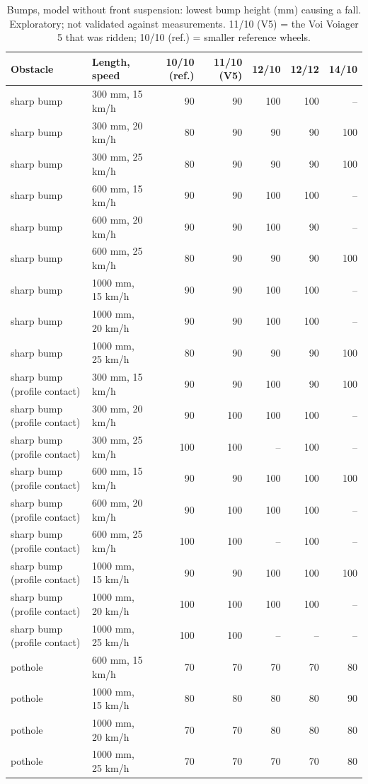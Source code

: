 \begin{table}[htbp]
\centering\small
\caption{Bumps, model without front suspension: lowest bump height (mm) causing a fall. Exploratory; not validated against measurements. 11/10 (V5) = the Voi Voiager 5 that was ridden; 10/10 (ref.) = smaller reference wheels.}\label{tab:D3}
\begin{tabular}{@{}llrrrrr@{}}
\toprule
Obstacle & Length, speed & 10/10 (ref.) & 11/10 (V5) & 12/10 & 12/12 & 14/10 \\
\midrule
sharp bump & 300 mm, 15 km/h & 90 & 90 & 100 & 100 & -- \\
sharp bump & 300 mm, 20 km/h & 80 & 90 & 90 & 90 & 100 \\
sharp bump & 300 mm, 25 km/h & 80 & 90 & 90 & 90 & 100 \\
sharp bump & 600 mm, 15 km/h & 90 & 90 & 100 & 100 & -- \\
sharp bump & 600 mm, 20 km/h & 90 & 90 & 100 & 90 & -- \\
sharp bump & 600 mm, 25 km/h & 80 & 90 & 90 & 90 & 100 \\
sharp bump & 1000 mm, 15 km/h & 90 & 90 & 100 & 100 & -- \\
sharp bump & 1000 mm, 20 km/h & 90 & 90 & 100 & 100 & -- \\
sharp bump & 1000 mm, 25 km/h & 80 & 90 & 90 & 90 & 100 \\
sharp bump (profile contact) & 300 mm, 15 km/h & 90 & 90 & 100 & 90 & 100 \\
sharp bump (profile contact) & 300 mm, 20 km/h & 90 & 100 & 100 & 100 & -- \\
sharp bump (profile contact) & 300 mm, 25 km/h & 100 & 100 & -- & 100 & -- \\
sharp bump (profile contact) & 600 mm, 15 km/h & 90 & 90 & 100 & 100 & 100 \\
sharp bump (profile contact) & 600 mm, 20 km/h & 90 & 100 & 100 & 100 & -- \\
sharp bump (profile contact) & 600 mm, 25 km/h & 100 & 100 & -- & 100 & -- \\
sharp bump (profile contact) & 1000 mm, 15 km/h & 90 & 90 & 100 & 100 & 100 \\
sharp bump (profile contact) & 1000 mm, 20 km/h & 100 & 100 & 100 & 100 & -- \\
sharp bump (profile contact) & 1000 mm, 25 km/h & 100 & 100 & -- & -- & -- \\
pothole & 600 mm, 15 km/h & 70 & 70 & 70 & 70 & 80 \\
pothole & 1000 mm, 15 km/h & 80 & 80 & 80 & 80 & 90 \\
pothole & 1000 mm, 20 km/h & 70 & 70 & 80 & 80 & 80 \\
pothole & 1000 mm, 25 km/h & 70 & 70 & 70 & 70 & 80 \\
\bottomrule
\end{tabular}
\end{table}

